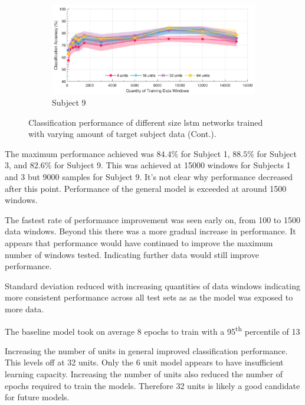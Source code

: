 \begin{figure}[t]\ContinuedFloat
    \begin{subfigure}[b]{\textwidth}
        \centering
        \includegraphics[width=\textwidth]{content/5-Personalisation/Bespoke_Target/ch5_bespoke_target_model_subject_9.pdf}
        \caption{Subject 9}
        \label{fig:ch5_32_unit_bespoke_model}
    \end{subfigure}
    \caption[]{Classification performance of different size \acrshort{lstm} networks trained with varying amount of target subject data (Cont.).}
\end{figure}

The maximum performance achieved was $84.4\%$ for Subject 1, $88.5\%$ for Subject 3, and $82.6\%$ for Subject 9. This was achieved at 15000 windows for Subjects 1 and 3 but 9000 samples for Subject 9. It's not clear why performance decreased after this point. Performance of the general model is exceeded at around 1500 windows.

The fastest rate of performance improvement was seen early on, from 100 to 1500 data windows. Beyond this there was a more gradual increase in performance. It appears that performance would have continued to improve the maximum number of windows tested. Indicating further data would still improve performance. 

Standard deviation reduced with increasing quantities of data windows indicating more consistent performance across all test sets as as the model was exposed to more data.

The baseline model took on average 8 epochs to train with a 95\textsuperscript{th} percentile of 13

Increasing the number of units in general improved classification performance. This levels off at 32 units. Only the 6 unit model appears to have insufficient learning capacity. Increasing the number of units also reduced the number of epochs required to train the models. Therefore 32 units is likely a good candidate for future models.

